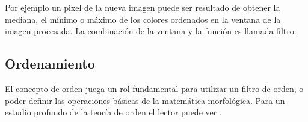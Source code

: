 Por ejemplo un pixel de la nueva imagen puede ser resultado de obtener la mediana, el m\'inimo o m\'aximo de los colores ordenados en la ventana de la imagen procesada.  
La combinaci\'on de la ventana y la funci\'on es llamada filtro. 

\subsection{Ordenamiento}
El concepto de orden juega un rol fundamental para utilizar un filtro de orden, o poder definir las operaciones b\'asicas de la matem\'atica morfol\'ogica. Para un estudio profundo de la teor\'ia de orden el lector puede ver \cite{serra1993anamorphoses}.


  

